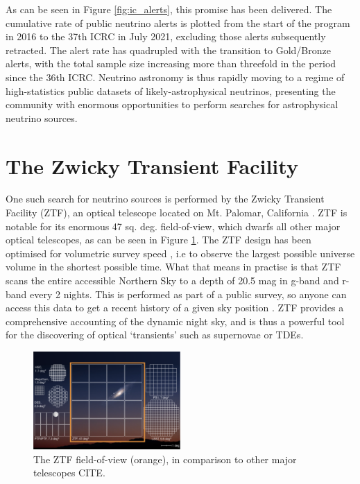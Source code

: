 \documentclass[a4paper,11pt]{article}
\begin{document}
As can be seen in Figure \ref{fig:ic_alerts}, this promise has been delivered. The cumulative rate of public neutrino alerts is plotted from the start of the program in 2016 to the 37th ICRC in July 2021, excluding those alerts subsequently retracted. The alert rate has quadrupled with the transition to Gold/Bronze alerts, with the total sample size increasing more than threefold in the period since the 36th ICRC. Neutrino astronomy is thus rapidly moving to a regime of high-statistics public datasets of likely-astrophysical neutrinos, presenting the community with enormous opportunities to perform searches for astrophysical neutrino sources. 

\section{The Zwicky Transient Facility}

One such search for neutrino sources is performed by the Zwicky Transient Facility (ZTF), an optical telescope located on Mt. Palomar, California \cite{ztf_19_science}. ZTF is notable for its enormous 47 sq. deg. field-of-view, which dwarfs all other major optical telescopes, as can be seen in Figure \ref{fig:ztf_fov}. The ZTF design has been optimised for volumetric survey speed \cite{ztf_system}, i.e to observe the largest possible universe volume in the shortest possible time. What that means in practise is that ZTF scans the entire accessible Northern Sky to a depth of 20.5 mag in g-band and r-band every 2 nights. This is performed as part of a public survey, so anyone can access this data to get a recent history of a given sky position \cite{ztf_survey_19}. ZTF provides a comprehensive accounting of the dynamic night sky, and is thus a powerful tool for the discovering of optical `transients' such as supernovae or TDEs.  

\begin{figure}[!ht]
	\centering \includegraphics[width=0.50\textwidth]{figures/ztf_fov}
	\caption{The ZTF field-of-view (orange), in comparison to other major telescopes CITE.}
	\label{fig:ztf_fov}
\end{figure}
\end{document}
